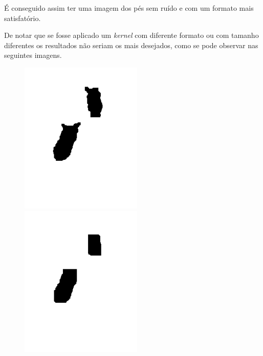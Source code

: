 \documentclass[a4paper]{report}
\begin{document}
É conseguido assim ter uma imagem dos pés sem ruído e com um formato mais satisfatório.

De notar que se fosse aplicado um \textit{kernel} com diferente formato ou com tamanho diferentes
os resultados não seriam os mais desejados, como se pode observar nas seguintes imagens.


\begin{figure}[H]
\centering
\begin{minipage}{.5\textwidth}
  \centering
    \includegraphics[width=0.52\textwidth]{images/building/closeDilate/close5.png}
\end{minipage}%
\begin{minipage}{.5\textwidth}
  \centering
    \includegraphics[width=0.52\textwidth]{images/building/closeDilate/close23.png}
\end{minipage}%
\end{figure}
\end{document}
